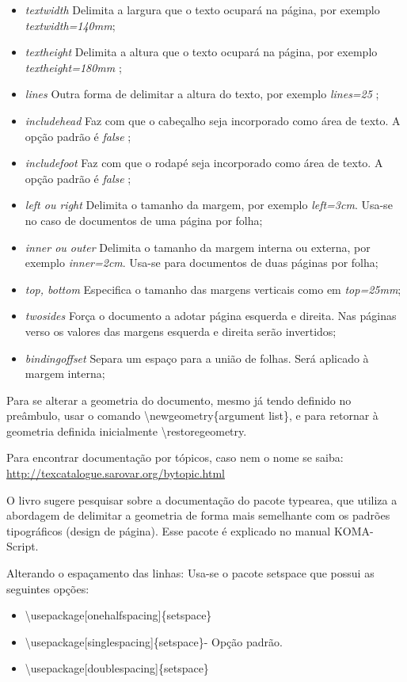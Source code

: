 \documentclass{a4paper, 12pts}{book}
\begin{document}
\begin{itemize}
    \item \emph{textwidth} Delimita a largura que o texto ocupará na página, por exemplo \emph{textwidth=140mm};
    \item \emph{textheight} Delimita a altura que o texto ocupará na página, por exemplo \emph{textheight=180mm} ;
    \item \emph{lines} Outra forma de delimitar a altura do texto, por exemplo \emph{lines=25} ;
    \item \emph{includehead} Faz com que o cabeçalho seja incorporado como área de texto. A opção padrão é \emph{false} ;
    \item \emph{includefoot} Faz com que o rodapé seja incorporado como área de texto. A opção padrão é \emph{false} ;
    \item \emph{left ou right} Delimita o tamanho da margem, por exemplo \emph{left=3cm}. Usa-se no caso de documentos de uma página por folha;
    \item \emph{inner ou outer} Delimita o tamanho da margem interna ou externa, por exemplo \emph{inner=2cm}. Usa-se para documentos de duas páginas por folha;
    \item \emph{top, bottom} Especifica o tamanho das margens verticais como em \emph{top=25mm};
    \item \emph{twosides} Força o documento a adotar página esquerda e direita. Nas páginas verso os valores das margens esquerda e direita serão invertidos;
    \item \emph{bindingoffset} Separa um espaço para a união de folhas. Será aplicado à margem interna;
\end{itemize}

Para se alterar a geometria do documento, mesmo já tendo definido no preâmbulo,
usar o comando \backslash newgeometry\{argument list\},
e para retornar à geometria definida inicialmente \backslash restoregeometry.

Para encontrar documentação por tópicos, caso nem o nome se saiba:
\url{http://texcatalogue.sarovar.org/bytopic.html}

O livro sugere pesquisar sobre a documentação do pacote typearea, que utiliza a abordagem de delimitar a geometria
de forma mais semelhante com os padrões tipográficos (design de página).
Esse pacote é explicado no manual KOMA-Script.

Alterando o espaçamento das linhas:
Usa-se o pacote setspace que possui as seguintes opções:
\begin{itemize}
    \item \backslash usepackage[onehalfspacing]\{setspace\}
    \item \backslash usepackage[singlespacing]\{setspace\}- Opção padrão.
    \item \backslash usepackage[doublespacing]\{setspace\}
\end{itemize}
\end{document}
